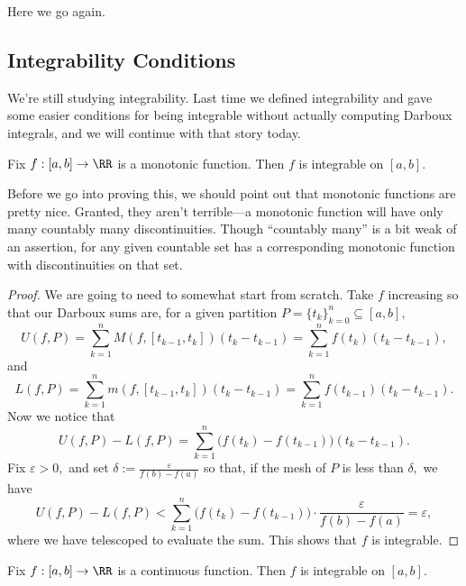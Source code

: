 
















Here we go again.

\subsection{Integrability Conditions}
We're still studying integrability. Last time we defined integrability and gave some easier conditions for being integrable without actually computing Darboux integrals, and we will continue with that story today.
\begin{proposition}
	Fix $f:[a,b]\to\RR$ is a monotonic function. Then $f$ is integrable on $[a,b].$
\end{proposition}
Before we go into proving this, we should point out that monotonic functions are pretty nice. Granted, they aren't terrible---a monotonic function will have only many countably many discontinuities.\todo{} Though ``countably many'' is a bit weak of an assertion, for any given countable set has a corresponding monotonic function with discontinuities on that set.
\begin{proof}
	We are going to need to somewhat start from scratch. Take $f$ increasing so that our Darboux sums are, for a given partition $P=\{t_k\}_{k=0}^n\subseteq[a,b],$
	\[U(f,P)=\sum_{k=1}^nM(f,[t_{k-1},t_k])(t_k-t_{k-1})=\sum_{k=1}^nf(t_k)(t_k-t_{k-1}),\]
	and
	\[L(f,P)=\sum_{k=1}^nm(f,[t_{k-1},t_k])(t_k-t_{k-1})=\sum_{k=1}^nf(t_{k-1})(t_k-t_{k-1}).\]
	Now we notice that
	\[U(f,P)-L(f,P)=\sum_{k=1}^n\big(f(t_k)-f(t_{k-1})\big)(t_k-t_{k-1}).\]
	Fix $\varepsilon>0,$ and set $\delta:=\frac{\varepsilon}{f(b)-f(a)}$ so that, if the mesh of $P$ is less than $\delta,$ we have
	\[U(f,P)-L(f,P)<\sum_{k=1}^n\big(f(t_k)-f(t_{k-1})\big)\cdot\frac{\varepsilon}{f(b)-f(a)}=\varepsilon,\]
	where we have telescoped to evaluate the sum. This shows that $f$ is integrable.
\end{proof}
\begin{prop}
	Fix $f:[a,b]\to\RR$ is a continuous function. Then $f$ is integrable on $[a,b].$
\end{prop}
